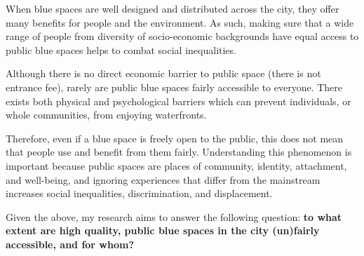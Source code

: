 \documentclass{article}
\newcommand{\bisection}[1]{\textbf{\textit{#1}}}
\begin{document}
When blue spaces are well designed and distributed across the city, they offer many benefits for people and the environment. As such, making sure that a wide range of people from diversity of socio-economic backgrounds have equal access to public blue spaces helps to combat social inequalities. 

Although there is no direct economic barrier to public space (there is not entrance fee), rarely are public blue spaces fairly accessible to everyone. There exists both physical and psychological barriers which can prevent individuals, or whole communities, from enjoying waterfronts.

Therefore, even if a blue space is freely open to the public, this does not mean that people use and benefit from them fairly. Understanding this phenomenon is important because public spaces are places of community, identity, attachment, and well-being, and ignoring experiences that differ from the mainstream increases social inequalities, discrimination, and displacement.

Given the above, my research aims to answer the following question: \textbf{to what extent are high quality, public blue spaces in the city (un)fairly accessible, and for whom?}

\end{document}
